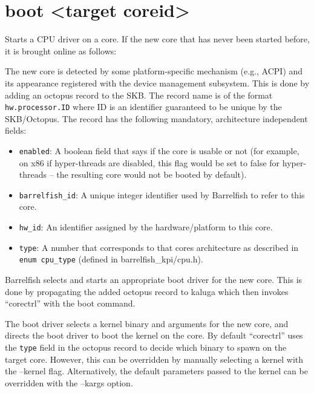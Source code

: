 \documentclass[a4paper,11pt,twoside]{report}
\begin{document}
{{\section{boot \textless target coreid\textgreater}

Starts a CPU driver on a core. If the new core that has never been started
before, it is brought online as follows:

\begin{penumerate}

\item The new core is detected by some platform-specific mechanism (e.g., ACPI)
and its appearance registered with the device management subsystem. This is done
by adding an octopus record to the SKB. The record name is of the format
\texttt{hw.processor.ID} where ID is an identifier guaranteed to be unique by the
SKB/Octopus. The record has the following mandatory, architecture independent
fields:

\begin{itemize}

\item \texttt{enabled}: A boolean field that says if the core is usable or not
(for example, on x86 if hyper-threads are disabled, this flag would be set to
false for hyper-threads -- the resulting core would not be booted by default).

\item \texttt{barrelfish\_id}: A unique integer identifier used by Barrelfish to
refer to this core.

\item \texttt{hw\_id}: An identifier assigned by the hardware/platform to this
core.

\item \texttt{type}: A number that corresponds to that cores architecture as
described in \texttt{enum cpu\_type} (defined in barrelfish\_kpi/cpu.h).

\end{itemize}

\item Barrelfish selects and starts an appropriate boot driver for the new core.
This is done by propagating the added octopus record to kaluga which then
invokes ``corectrl'' with the boot command.

\item The boot driver selects a kernel binary and arguments for the new core,
and directs the boot driver to boot the kernel on the core. By default
``corectrl'' uses the \texttt{type} field in the octopus record to decide which
binary to spawn on the target core. However, this can be overridden by manually
selecting a kernel with the --kernel flag. Alternatively, the default
parameters passed to the kernel can be overridden with the --kargs option.


\end{penumerate}}}
\end{document}
